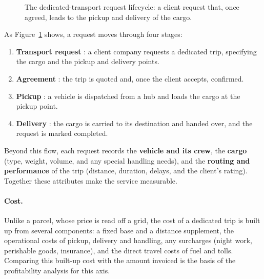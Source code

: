 \begin{figure}[H]
\centering
{}
\caption{The dedicated-transport request lifecycle: a client request that, once agreed, leads to the
pickup and delivery of the cargo.}
\label{fig:ch3-transport-flow}
\end{figure}

As Figure~\ref{fig:ch3-transport-flow} shows, a request moves through four stages:

\begin{enumerate}[noitemsep, label=\textbf{\arabic*.}]
    \item \textbf{Transport request} : a client company requests a dedicated trip, specifying the
          cargo and the pickup and delivery points.
    \item \textbf{Agreement} : the trip is quoted and, once the client accepts, confirmed.
    \item \textbf{Pickup} : a vehicle is dispatched from a hub and loads the cargo at the pickup point.
    \item \textbf{Delivery} : the cargo is carried to its destination and handed over, and the
          request is marked completed.
\end{enumerate}

Beyond this flow, each request records the \textbf{vehicle and its crew}, the \textbf{cargo} (type,
weight, volume, and any special handling needs), and the \textbf{routing and performance} of the trip
(distance, duration, delays, and the client's rating). Together these attributes make the service
measurable.

\paragraph{Cost.}
Unlike a parcel, whose price is read off a grid, the cost of a dedicated trip is built up from several
components: a fixed base and a distance supplement, the operational costs of pickup, delivery and
handling, any surcharges (night work, perishable goods, insurance), and the direct travel costs of
fuel and tolls. Comparing this built-up cost with the amount invoiced is the basis of the
profitability analysis for this axis.

